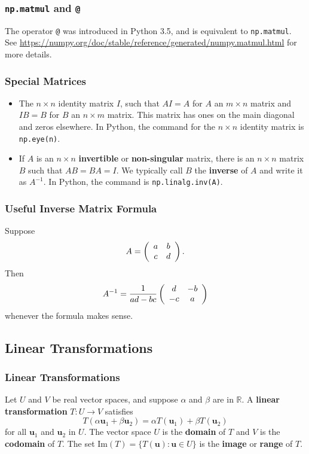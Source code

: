 \documentclass{beamer}
\begin{document}
\begin{frame}
\frametitle{\texttt{np.matmul} and \texttt{@}}
The operator \texttt{@} was introduced in Python 3.5, and is equivalent to \texttt{np.matmul}. See \url{https://numpy.org/doc/stable/reference/generated/numpy.matmul.html} for more details.
\end{frame}

\begin{frame}
\frametitle{Special Matrices}
\begin{itemize} 
\item The $n\times n$ identity matrix $I$, such that $A I = A$ for $A$ an $m\times n$ matrix and $I B = B$ for $B$ an $n\times m$ matrix. This matrix has ones on the main diagonal and zeros elsewhere. In Python, the command for the $n\times n$ identity matrix is \texttt{np.eye(n)}.
\item If $A$ is an $n\times n$ {\bf invertible} or {\bf non-singular} matrix, there is an $n\times n$ matrix $B$ such that $AB = BA = I$. We typically call $B$ the {\bf inverse} of $A$ and write it as $A^{-1}$. In Python, the command is \texttt{np.linalg.inv(A)}.
\end{itemize}
\end{frame}

\begin{frame}
\frametitle{Useful Inverse Matrix Formula}
Suppose
$$
A = \left(\begin{array}{c c} a	& 	b\\	c	&	d\end{array}\right).
$$
Then
$$
A^{-1} = \frac{1}{ad -bc}\left(\begin{array}{c c}	d	&	-b\\	-c	&	a\end{array}\right)
$$
whenever the formula makes sense.
\end{frame}

\subsection{Linear Transformations}

\begin{frame}
\frametitle{Linear Transformations}
\begin{Definition}
Let $U$ and $V$ be real vector spaces, and suppose $\alpha$ and $\beta$ are in $\mathbb{R}$. A {\bf linear transformation} $T: U\to V$ satisfies 
$$
T(\alpha {\boldsymbol u_1} + \beta {\boldsymbol u_2}) = \alpha T({\boldsymbol u_1}) + \beta T({\boldsymbol u_2})
$$
for all ${\boldsymbol u_1}$ and ${\boldsymbol u_2}$ in $U$. The vector space $U$ is the {\bf domain} of $T$ and $V$ is the {\bf codomain} of $T$. The set $\text{Im}(T) = \{T({\boldsymbol u}) : {\boldsymbol u}\in U\}$ is the {\bf image} or {\bf range} of $T$.
\end{Definition}

\end{frame}
\end{document}
